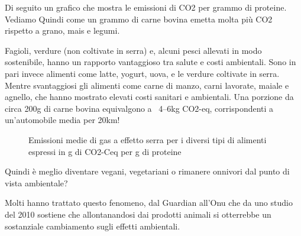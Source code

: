 \documentclass[12pt]{book} %
\begin{document}
Di seguito un grafico che mostra le emissioni di CO2 per grammo di proteine. Vediamo Quindi come un grammo di carne
bovina emetta molta più CO2 rispetto a grano, mais e legumi. 

Fagioli, verdure (non coltivate in serra) e, alcuni pesci allevati in modo sostenibile, hanno un
rapporto vantaggioso tra salute e costi ambientali. Sono in pari invece alimenti come latte, yogurt, uova, e le verdure
coltivate in serra. Mentre svantaggiosi gli alimenti come carne di manzo, carni lavorate, maiale e agnello, che hanno
mostrato elevati costi sanitari e ambientali. Una porzione da circa 200g di carne bovina equivalgono a ~4–6kg CO2-eq, corrispondenti a un’automobile media per 20km!

\needspace{4cm}
\begin{figure}[H]
\centering
{}
\caption{Emissioni medie di gas a effetto serra per i diversi tipi di alimenti espressi in g di CO2-Ceq per g di proteine}
\end{figure}

Quindi è meglio diventare vegani, vegetariani o rimanere onnivori dal punto di vista ambientale?

Molti hanno trattato questo fenomeno, dal
Guardian
all'Onu che da uno studio del 2010 sostiene che allontanandosi dai prodotti animali si otterrebbe un sostanziale cambiamento
sugli effetti ambientali.
\end{document}
